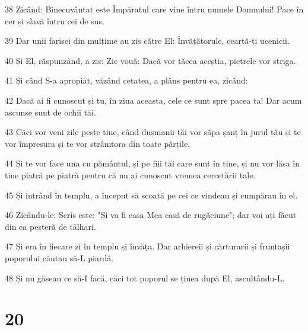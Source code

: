 \par 38 Zicând: Binecuvântat este Împăratul care vine întru numele Domnului! Pace în cer și slavă întru cei de sus.
\par 39 Dar unii farisei din mulțime au zis către El: Învățătorule, ceartă-ți ucenicii.
\par 40 Și El, răspunzând, a zis: Zic vouă: Dacă vor tăcea aceștia, pietrele vor striga.
\par 41 Și când S-a apropiat, văzând cetatea, a plâns pentru ea, zicând:
\par 42 Dacă ai fi cunoscut și tu, în ziua aceasta, cele ce sunt spre pacea ta! Dar acum ascunse sunt de ochii tăi.
\par 43 Căci vor veni zile peste tine, când dușmanii tăi vor săpa șanț în jurul tău și te vor împresura și te vor strâmtora din toate părțile.
\par 44 Și te vor face una cu pământul, și pe fiii tăi care sunt în tine, și nu vor lăsa în tine piatră pe piatră pentru că nu ai cunoscut vremea cercetării tale.
\par 45 Și intrând în templu, a început să scoată pe cei ce vindeau și cumpărau în el.
\par 46 Zicându-le: Scris este: "Și va fi casa Mea casă de rugăciune"; dar voi ați făcut din ea peșteră de tâlhari.
\par 47 Și era în fiecare zi în templu și învăța. Dar arhiereii și cărturarii și fruntașii poporului căutau să-L piardă.
\par 48 Și nu găseau ce să-I facă, căci tot poporul se ținea după El, ascultându-L.

\chapter{20}

